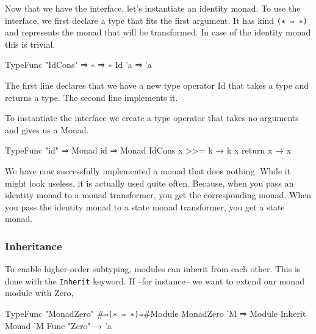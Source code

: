 \begin{multicols}{2}
  Now that we have the interface, let's instantiate an identity monad.
  To use the interface, we first declare a type that fits the first argument.
  It has kind \verb|(∗ ⇒ ∗)| and represents the monad that will be transformed.
  In case of the identity monad this is trivial.

  \begin{code}
  TypeFunc "IdCons" ⇒ ∗ ⇒ ∗
  Id 'a ⇒ 'a
  \end{code}

  The first line declares that we have a new type operator Id that takes a type and returns a type.
  The second line implements it. 

  To instantiate the interface we create a type operator that takes no arguments and gives us a Monad.
  
  \begin{code}
  TypeFunc "id" ⇒ Monad 
  id ⇒ Monad IdCons {
    x >>= k → k x
    return x → x
  }
  \end{code}

  We have now successfully implemented a monad that does nothing.
  While it might look useless, it is actually used quite often.
  Because, when you pass an identity monad to a monad transformer, you get the corresponding monad.
  When you pass the identity monad to a state monad transformer, you get a state monad.

  \pagebreak
  \subsubsection*{Inheritance}
  To enable higher-order subtyping, modules can inherit from each other.
  This is done with the \verb|Inherit| keyword. 
  If --for instance-- we want to extend our monad module with Zero, 

  \begin{code}
  TypeFunc "MonadZero" #\verb|⇒(∗ ⇒ ∗)⇒|#Module
  MonadZero 'M ⇒ Module {
    Inherit Monad 'M
    Func "Zero" → 'a
  }
  \end{code}

\end{multicols}

